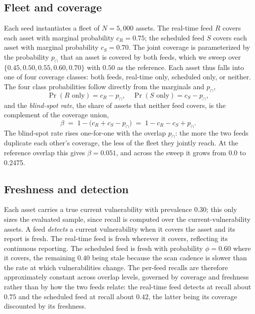 \documentclass[journal]{IEEEtran}
\begin{document}
\subsection{Fleet and coverage}
Each seed instantiates a fleet of $N = 5{,}000$ assets. The real-time feed $R$ covers each asset
with marginal probability $c_R = 0.75$; the scheduled feed $S$ covers each asset with marginal
probability $c_S = 0.70$. The joint coverage is parameterized by the probability $p_{\cap}$ that an
asset is covered by both feeds, which we sweep over $\{0.45, 0.50, 0.55, 0.60, 0.70\}$ with $0.50$
as the reference. Each asset thus falls into one of four coverage classes: both feeds, real-time
only, scheduled only, or neither. The four class probabilities follow directly from the marginals
and $p_{\cap}$,
\begin{equation}
\Pr(R\text{ only}) = c_R - p_{\cap}, \quad \Pr(S\text{ only}) = c_S - p_{\cap},
\label{eq:classes}
\end{equation}
and the \emph{blind-spot rate}, the share of assets that neither feed covers, is the complement of
the coverage union,
\begin{equation}
\beta \;=\; 1 - \big(c_R + c_S - p_{\cap}\big)\;=\; 1 - c_R - c_S + p_{\cap}.
\label{eq:blindspot}
\end{equation}
The blind-spot rate rises one-for-one with the overlap $p_{\cap}$: the more the two feeds duplicate
each other's coverage, the less of the fleet they jointly reach. At the reference overlap this gives
$\beta = 0.051$, and across the sweep it grows from 0.0 to 0.2475.

\subsection{Freshness and detection}
Each asset carries a true current vulnerability with prevalence $0.30$; this only sizes the
evaluated sample, since recall is computed over the current-vulnerability assets. A feed
\emph{detects} a current vulnerability when it covers the asset and its report is fresh. The
real-time feed is fresh wherever it covers, reflecting its continuous reporting. The scheduled feed
is fresh with probability $\phi = 0.60$ where it covers, the remaining $0.40$ being stale because
the scan cadence is slower than the rate at which vulnerabilities change. The per-feed recalls are
therefore approximately constant across overlap levels, governed by coverage and freshness rather
than by how the two feeds relate: the real-time feed detects at recall about $0.75$ and the
scheduled feed at recall about $0.42$, the latter being its coverage discounted by its freshness.
\end{document}
